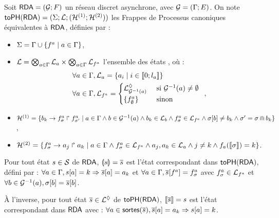 \begin{definition}
  Soit $\mathsf{RDA} = (\mathcal{G}; F)$ un réseau discret asynchrone, avec $\mathcal{G} = (\mathrm{\Gamma}; E)$.
  On note $\mathsf{toPH}(\mathsf{RDA}) = (\Sigma; \mathcal{L}; (\mathcal{H}^{(1)}; \mathcal{H}^{(2)}))$
  les Frappes de Processus canoniques équivalentes
  à $\mathsf{RDA}$, définies par :
  \begin{itemize}
    \item $\Sigma = \mathrm{\Gamma} \cup \{ f^a \mid a \in \mathrm{\Gamma} \}$,
    \item $\mathcal{L} = \bigotimes_{a \in \mathrm{\Gamma}} \mathcal{L}_{a} \times
      \bigotimes_{a \in \mathrm{\Gamma}} \mathcal{L}_{f^a}$ l'ensemble des états , où :
      \begin{align*}
      \forall a \in \mathrm{\Gamma}&, \mathcal{L}_{a} = \{ a_i \mid i \in \mathopen{\llbracket}0\mathclose{};l_a\mathclose{\rrbracket} \} \\
      \forall a \in \mathrm{\Gamma}&, \mathcal{L}_{f^a} = \begin{cases}
          \mathcal{L}^\lozenge_{\mathcal{G}^{-1}(a)} & \text{ si } \mathcal{G}^{-1}(a) \neq \emptyset \\
          \{ f^a_\emptyset \}  & \text{ sinon }
        \end{cases} \enspace,
      \end{align*}
    \item $\mathcal{H}^{(1)} = \{ b_k\rightarrow f^a_\sigma\Rsh f^a_{\sigma'} \mid
      a \in \mathrm{\Gamma} \wedge b \in \mathcal{G}^{-1}(a) \wedge
      b_k \in \mathcal{L}_{b} \wedge f^a_\sigma \in \mathcal{L}_{f^a} \wedge
      \sigma[{b}] \neq b_k \wedge \sigma' = \sigma \Cap b_k \}$,
    \item $\mathcal{H}^{(2)} = \{ f^a_\sigma\rightarrow a_j\Rsh a_{k} \mid
      a \in \mathrm{\Gamma} \wedge f^a_\sigma \in \mathcal{L}_{f^a} \wedge
      a_j, a_k \in \mathcal{L}_{a} \wedge j \neq k \wedge f_a(\llbracket\sigma\rrbracket) = k \}$.
  \end{itemize}
  
  Pour tout état $s \in \mathcal{S}$ de $\mathsf{RDA}$,
  $\llparenthesis s\rrparenthesis = \overline{s}$ est l'état correspondant dans $\mathsf{toPH}(\mathsf{RDA})$, défini par :
  $\forall a \in \mathrm{\Gamma}, s[{a}] = k \Rightarrow \overline{s}[{a}] = a_k$
  et
  $\forall a \in \mathrm{\Gamma}, \overline{s}[{f^a}]=f^a_\sigma$
  avec $f^a_\sigma \in \mathcal{L}_{f^a}$
  et $\forall b \in \mathcal{G}^{-1}(a), \sigma[{b}] = \overline{s}[{b}]$.

  À l'inverse, pour tout état $\overline{s} \in \mathcal{L}^\lozenge$ de $\mathsf{toPH}(\mathsf{RDA})$,
  $\llbracket\overline{s}\rrbracket = s$ est l'état correspondant dans $\mathsf{RDA}$ avec :
  $\forall a \in \mathsf{sortes}(\overline{s}), \overline{s}[{a}] = a_k \Rightarrow s[{a}] = k$.
\end{definition}

